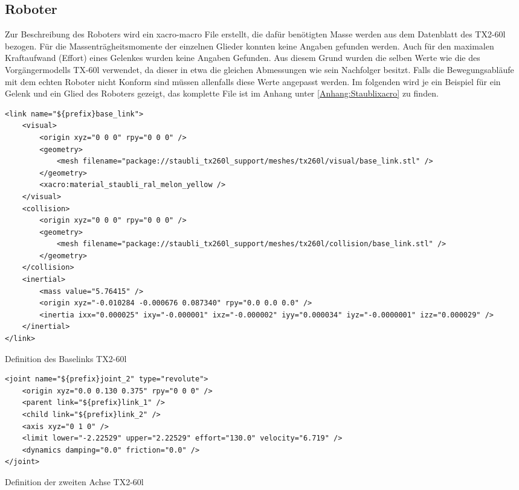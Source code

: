 \subsection{Roboter}
Zur Beschreibung des Roboters wird ein xacro-macro File erstellt, die dafür benötigten Masse werden aus dem Datenblatt des TX2-60l bezogen. Für die Massenträgheitsmomente der einzelnen Glieder konnten keine Angaben gefunden werden. Auch für den maximalen Kraftaufwand (Effort) eines Gelenkes wurden keine Angaben Gefunden. Aus diesem Grund wurden die selben Werte wie die des Vorgängermodells TX-60l verwendet, da dieser in etwa die gleichen Abmessungen wie sein Nachfolger besitzt. Falls die Bewegungsabläufe mit dem echten Roboter nicht Konform sind müssen allenfalls diese Werte angepasst werden. Im folgenden wird je ein Beispiel für ein Gelenk und ein Glied des Roboters gezeigt, das komplette File ist im Anhang unter \ref{Anhang:Staublixacro} zu finden.

\begin{code}
	\begin{verbatim}
<link name="${prefix}base_link">
	<visual>
		<origin xyz="0 0 0" rpy="0 0 0" />
		<geometry>
			<mesh filename="package://staubli_tx260l_support/meshes/tx260l/visual/base_link.stl" />
		</geometry>
		<xacro:material_staubli_ral_melon_yellow />
	</visual>
	<collision>
		<origin xyz="0 0 0" rpy="0 0 0" />
		<geometry>
			<mesh filename="package://staubli_tx260l_support/meshes/tx260l/collision/base_link.stl" />
		</geometry>
	</collision>
	<inertial>
		<mass value="5.76415" />
		<origin xyz="-0.010284 -0.000676 0.087340" rpy="0.0 0.0 0.0" />
		<inertia ixx="0.000025" ixy="-0.000001" ixz="-0.000002" iyy="0.000034" iyz="-0.0000001" izz="0.000029" />
	</inertial>
</link>
	\end{verbatim}
	\vspace{-15pt}
	\caption{Definition des Baselinks TX2-60l}
	\label{code:baseLink}
\end{code}
\begin{code}
	\begin{verbatim}
<joint name="${prefix}joint_2" type="revolute">
	<origin xyz="0.0 0.130 0.375" rpy="0 0 0" />
	<parent link="${prefix}link_1" />
	<child link="${prefix}link_2" />
	<axis xyz="0 1 0" />
	<limit lower="-2.22529" upper="2.22529" effort="130.0" velocity="6.719" />
	<dynamics damping="0.0" friction="0.0" />
</joint>
	\end{verbatim}
	\vspace{-15pt}
	\caption{Definition der zweiten Achse TX2-60l}
	\label{code:joint}
\end{code}

